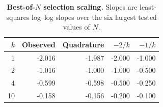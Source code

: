 \begin{table}[t]
  \centering
  \caption{\textbf{Best-of-$N$ selection scaling.} Slopes are least-squares log--log slopes over the six largest tested values of $N$.}
  \label{tab:synthetic-selection-scaling}
  \begin{tabular}{rrrrr}
    \toprule
    $k$ & Observed & Quadrature & $-2/k$ & $-1/k$ \\
    \midrule
    1 & -2.016 & -1.987 & -2.000 & -1.000 \\
    2 & -1.016 & -1.000 & -1.000 & -0.500 \\
    4 & -0.599 & -0.598 & -0.500 & -0.250 \\
    10 & -0.158 & -0.156 & -0.200 & -0.100 \\
    \bottomrule
  \end{tabular}
\end{table}
